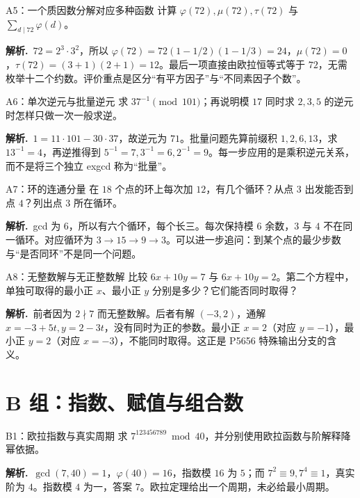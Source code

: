 \documentclass[UTF8,a4paper,11pt,twoside,openright,fontset=fandol]{ctexbook}
\theoremstyle{definition}
\newcommand{\sol}{\par\noindent\textbf{解析.}\ }
\begin{document}
\begin{problem}{A5：一个质因数分解对应多种函数}
计算 $\varphi(72),\mu(72),\tau(72)$ 与 $\sum_{d\mid72}\varphi(d)$。
\end{problem}

\sol $72=2^3\cdot3^2$，所以 $\varphi(72)=72(1-1/2)(1-1/3)=24$，$\mu(72)=0$，$\tau(72)=(3+1)(2+1)=12$。最后一项直接由欧拉恒等式等于 $72$，无需枚举十二个约数。评价重点是区分“有平方因子”与“不同素因子个数”。


\begin{problem}{A6：单次逆元与批量逆元}
求 $37^{-1}\pmod{101}$；再说明模 $17$ 同时求 $2,3,5$ 的逆元时怎样只做一次一般求逆。
\end{problem}

\sol $1=11\cdot101-30\cdot37$，故逆元为 $71$。批量问题先算前缀积 $1,2,6,13$，求 $13^{-1}=4$，再逆推得到 $5^{-1}=7,3^{-1}=6,2^{-1}=9$。每一步应用的是乘积逆元关系，而不是将三个独立 exgcd 称为“批量”。


\begin{problem}{A7：环的连通分量}
在 $18$ 个点的环上每次加 $12$，有几个循环？从点 $3$ 出发能否到点 $4$？列出点 $3$ 所在循环。
\end{problem}

\sol gcd 为 $6$，所以有六个循环，每个长三。每次保持模 $6$ 余数，$3$ 与 $4$ 不在同一循环。对应循环为 $3\to15\to9\to3$。可以进一步追问：到某个点的最少步数与“是否同环”不是同一个问题。


\begin{problem}{A8：无整数解与无正整数解}
比较 $6x+10y=7$ 与 $6x+10y=2$。第二个方程中，单独可取得的最小正 $x$、最小正 $y$ 分别是多少？它们能否同时取得？
\end{problem}

\sol 前者因为 $2\nmid7$ 而无整数解。后者有解 $(-3,2)$，通解 $x=-3+5t,y=2-3t$，没有同时为正的参数。最小正 $x=2$（对应 $y=-1$），最小正 $y=2$（对应 $x=-3$），不能同时取得。这正是 P5656 特殊输出分支的含义。


\section{B 组：指数、赋值与组合数}
\begin{problem}{B1：欧拉指数与真实周期}
求 $7^{123456789}\bmod40$，并分别使用欧拉函数与阶解释降幂依据。
\end{problem}

\sol $\gcd(7,40)=1$，$\varphi(40)=16$，指数模 $16$ 为 $5$；而 $7^2\equiv9,7^4\equiv1$，真实阶为 $4$。指数模 $4$ 为一，答案 $7$。欧拉定理给出一个周期，未必给最小周期。
\end{document}
